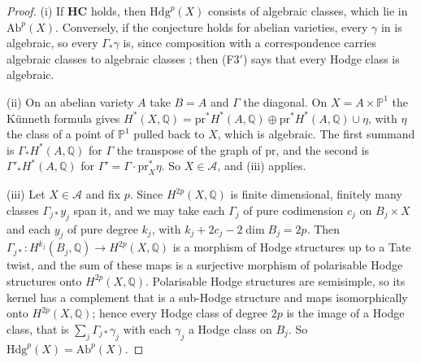 \documentclass[11pt,reqno]{amsart}
\theoremstyle{plain}
\theoremstyle{definition}
\theoremstyle{remark}
\newcommand{\QQ}{\mathbb{Q}}
\newcommand{\PP}{\mathbb{P}}
\newcommand{\Hdg}{\mathrm{Hdg}}
\begin{document}
\begin{proof}
(i) If $\mathbf{HC}$ holds, then $\Hdg^{p}(X)$ consists of algebraic classes,
which lie in $\mathrm{Ab}^{p}(X)$. Conversely, if the conjecture holds for
abelian varieties, every $\gamma$ in  is algebraic, so
every $\Gamma_{*}\gamma$ is, since composition with a correspondence carries
algebraic classes to algebraic classes \cite[Chapter~16]{Ful98}; then
\textup{(F3$'$)} says that every Hodge class is algebraic.

(ii) On an abelian variety $A$ take $B=A$ and $\Gamma$ the diagonal. On
$X=A\times\PP^{1}$ the K\"unneth formula gives
$H^{*}(X,\QQ)=\mathrm{pr}^{*}H^{*}(A,\QQ)\oplus
\mathrm{pr}^{*}H^{*}(A,\QQ)\cup\eta$, with $\eta$ the class of a point of
$\PP^{1}$ pulled back to $X$, which is algebraic. The first summand is
$\Gamma_{*}H^{*}(A,\QQ)$ for $\Gamma$ the transpose of the graph of
$\mathrm{pr}$, and the second is $\Gamma'_{*}H^{*}(A,\QQ)$ for
$\Gamma'=\Gamma\cdot\mathrm{pr}_{X}^{*}\eta$. So $X\in\mathcal{A}$, and
(iii) applies.

(iii) Let $X\in\mathcal{A}$ and fix $p$. Since $H^{2p}(X,\QQ)$ is finite
dimensional, finitely many classes $\Gamma_{j*}y_{j}$ span it, and we may
take each $\Gamma_{j}$ of pure codimension $c_{j}$ on $B_{j}\times X$ and each
$y_{j}$ of pure degree $k_{j}$, with $k_{j}+2c_{j}-2\dim B_{j}=2p$. Then
$\Gamma_{j*}\colon H^{k_{j}}(B_{j},\QQ)\to H^{2p}(X,\QQ)$ is a morphism of
Hodge structures up to a Tate twist, and the sum of these maps is a
surjective morphism of polarisable Hodge structures onto $H^{2p}(X,\QQ)$.
Polarisable Hodge structures are semisimple, so its kernel has a complement
that is a sub-Hodge structure and maps isomorphically onto $H^{2p}(X,\QQ)$;
hence every Hodge class of degree $2p$ is the image of a Hodge class, that is
$\sum_{j}\Gamma_{j*}\gamma_{j}$ with each $\gamma_{j}$ a Hodge class on
$B_{j}$. So $\Hdg^{p}(X)=\mathrm{Ab}^{p}(X)$.


\end{proof}
\end{document}
